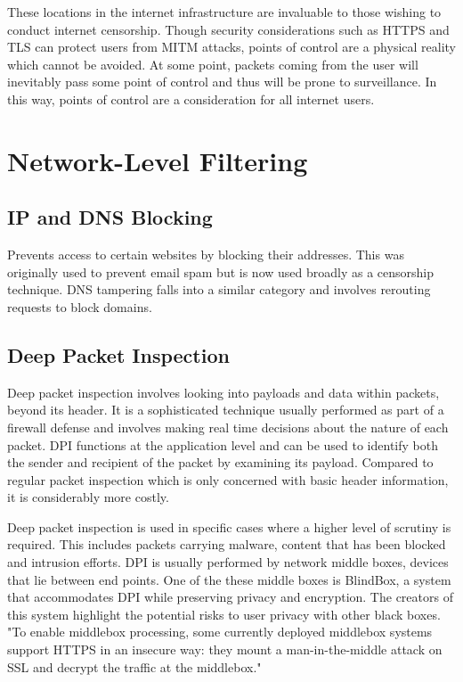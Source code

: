 These locations in the internet infrastructure are invaluable to those wishing to conduct internet censorship. Though security considerations such as HTTPS and TLS can protect users from MITM attacks, points of control are a physical reality which cannot be avoided. At some point, packets coming from the user will inevitably pass some point of control and thus will be prone to surveillance. In this way, points of control are a consideration for all internet users.















\section{Network-Level Filtering }
\subsection{IP and DNS Blocking}
Prevents access to certain websites by blocking their addresses. This was originally used to prevent email spam but is now used broadly as a censorship technique. DNS tampering falls into a similar category and involves rerouting requests to block domains.  
 
\subsection{Deep Packet Inspection}
Deep packet inspection involves looking into payloads and data within packets, beyond its header. It is a sophisticated technique usually performed as part of a firewall defense and involves making real time decisions about the nature of each packet. DPI functions at the application level and can be used to identify both the sender and recipient of the packet by examining its payload. Compared to regular packet inspection which is only concerned with basic header information, it is considerably more costly. 

Deep packet inspection is used in specific cases where a higher level of scrutiny is required. This includes packets carrying malware, content that has been blocked and intrusion efforts. DPI is usually performed by network middle boxes, devices that lie between end points. One of the these middle boxes is BlindBox, a system that accommodates DPI while preserving privacy and encryption. The creators of this system highlight the potential risks to user privacy with other black boxes. "To enable middlebox processing, some currently deployed middlebox systems support HTTPS in
an insecure way: they mount a man-in-the-middle attack on SSL and decrypt the traffic at the middlebox." \cite{sherry2015blindbox}

